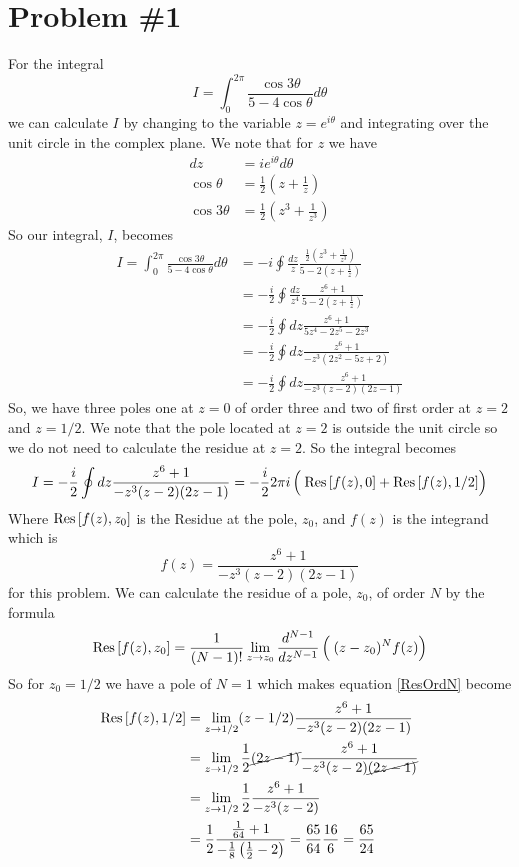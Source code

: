 \documentclass[11pt]{article}
\numberwithin{equation}{section}
\begin{document}


\section{Problem \#1}
For the integral 
$$I = \int_{0}^{2\pi}\frac{\cos3\theta}{5-4\cos\theta}d\theta$$
we can calculate $I$ by changing to the variable $z=e^{i\theta}$ and integrating over the 
unit circle in the complex plane. We note that for $z$ we have
\begin{align*}
dz &= ie^{i\theta}d\theta\\
\cos{\theta} &= \frac{1}{2}\left(z+\frac{1}{z}\right)\\
\cos{3\theta} &= \frac{1}{2}\left(z^3+\frac{1}{z^3}\right)
\end{align*}
So our integral, $I$, becomes
\begin{align*}
I = \int_{0}^{2\pi}\frac{\cos3\theta}{5-4\cos\theta}d\theta &= -i\oint\frac{dz}{z}\frac{\frac{1}{2}\left(z^3+\frac{1}{z^3}\right)}{5-2\left(z+\frac{1}{z}\right)}\\
&= -\frac{i}{2}\oint\frac{dz}{z^4}\frac{z^6+1}{5-2\left(z+\frac{1}{z}\right)}\\
&= -\frac{i}{2}\oint dz\frac{z^6+1}{5z^4-2z^5-2z^3}\\
&= -\frac{i}{2}\oint dz\frac{z^6+1}{-z^3(2z^2-5z+2)}\\
&= -\frac{i}{2}\oint dz\frac{z^6+1}{-z^3(z-2)(2z-1)}
\end{align*}
So, we have three poles one at $z=0$ of order three and two of first order at $z=2$ and 
$z=1/2$.  We note that the pole located at $z=2$ is outside the unit circle so we do not 
need to calculate the residue at $z=2$. So the integral becomes
$$I = -\frac{i}{2}\oint dz\frac{z^6+1}{-z^3(z-2)(2z-1)} = -\frac{i}{2}2\pi{i}\left(\frac{}{}\textnormal{Res}\left[{f(z)},{0}\right]+\textnormal{Res}\left[{f(z)},{1/2}\right]\right)$$
Where $\textnormal{Res}\left[{f(z)},{z_0}\right]$ is the Residue at the pole, $z_0$, and $f(z)$ is the integrand
which is 
$$f(z) = \frac{z^6+1}{-z^3(z-2)(2z-1)}$$
for this problem. We can calculate the residue of a pole, $z_0$, of order $N$ by the formula
\begin{equation}
\textnormal{Res}\left[{f(z)},{z_0}\right] = \frac{1}{(N-1)!}\lim_{z\rightarrow{z_0}}\frac{d^{N-1}}{dz^{N-1}}\left(\frac{}{}(z-z_0)^Nf(z)\right)
\label{ResOrdN}
\end{equation}
So for $z_0=1/2$ we have a pole of $N=1$ which makes equation \ref{ResOrdN} become
\begin{align*}
\textnormal{Res}\left[{f(z)},{1/2}\right] &= \lim_{z\rightarrow{1/2}}(z-1/2)\frac{z^6+1}{-z^3(z-2)(2z-1)}\\
&= \lim_{z\rightarrow{1/2}}\frac{1}{2}\cancel{(2z-1)}\frac{z^6+1}{-z^3(z-2)\cancel{(2z-1)}}\\
&= \lim_{z\rightarrow{1/2}}\frac{1}{2}\frac{z^6+1}{-z^3(z-2)}\\
&= \frac{1}{2}\frac{\frac{1}{64}+1}{-\frac{1}{8}\left(\frac{1}{2}-2\right)}= \frac{65}{64}\frac{16}{6} = \frac{65}{24}
\end{align*}
\end{document}
